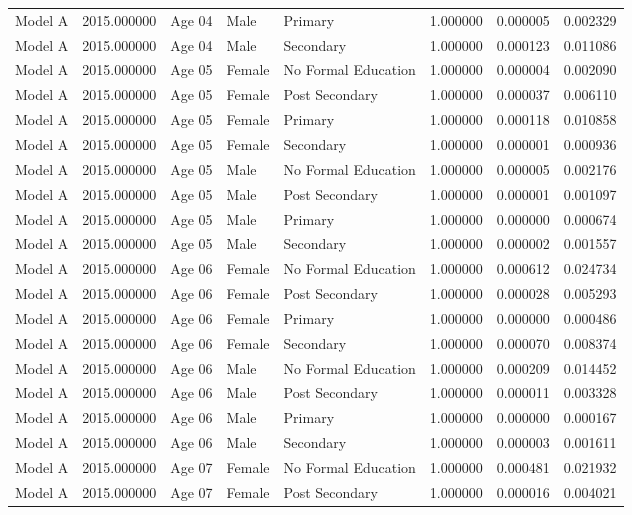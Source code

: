 \begin{table}[ht]
\begin{tabular}{lrlllrrr}
Model A & 2015.000000 & Age 04 & Male & Primary & 1.000000 & 0.000005 & 0.002329 \\
Model A & 2015.000000 & Age 04 & Male & Secondary & 1.000000 & 0.000123 & 0.011086 \\
Model A & 2015.000000 & Age 05 & Female & No Formal Education & 1.000000 & 0.000004 & 0.002090 \\
Model A & 2015.000000 & Age 05 & Female & Post Secondary & 1.000000 & 0.000037 & 0.006110 \\
Model A & 2015.000000 & Age 05 & Female & Primary & 1.000000 & 0.000118 & 0.010858 \\
Model A & 2015.000000 & Age 05 & Female & Secondary & 1.000000 & 0.000001 & 0.000936 \\
Model A & 2015.000000 & Age 05 & Male & No Formal Education & 1.000000 & 0.000005 & 0.002176 \\
Model A & 2015.000000 & Age 05 & Male & Post Secondary & 1.000000 & 0.000001 & 0.001097 \\
Model A & 2015.000000 & Age 05 & Male & Primary & 1.000000 & 0.000000 & 0.000674 \\
Model A & 2015.000000 & Age 05 & Male & Secondary & 1.000000 & 0.000002 & 0.001557 \\
Model A & 2015.000000 & Age 06 & Female & No Formal Education & 1.000000 & 0.000612 & 0.024734 \\
Model A & 2015.000000 & Age 06 & Female & Post Secondary & 1.000000 & 0.000028 & 0.005293 \\
Model A & 2015.000000 & Age 06 & Female & Primary & 1.000000 & 0.000000 & 0.000486 \\
Model A & 2015.000000 & Age 06 & Female & Secondary & 1.000000 & 0.000070 & 0.008374 \\
Model A & 2015.000000 & Age 06 & Male & No Formal Education & 1.000000 & 0.000209 & 0.014452 \\
Model A & 2015.000000 & Age 06 & Male & Post Secondary & 1.000000 & 0.000011 & 0.003328 \\
Model A & 2015.000000 & Age 06 & Male & Primary & 1.000000 & 0.000000 & 0.000167 \\
Model A & 2015.000000 & Age 06 & Male & Secondary & 1.000000 & 0.000003 & 0.001611 \\
Model A & 2015.000000 & Age 07 & Female & No Formal Education & 1.000000 & 0.000481 & 0.021932 \\
Model A & 2015.000000 & Age 07 & Female & Post Secondary & 1.000000 & 0.000016 & 0.004021 \\

\end{tabular}
\end{table}
